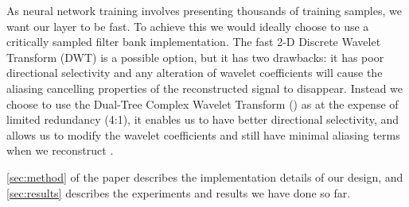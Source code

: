 As neural network training involves presenting thousands of training samples, we want our layer to
be fast. To achieve this we would ideally choose to use a critically sampled filter bank
implementation. The fast 2-D Discrete Wavelet Transform (DWT) is a possible option, but it has two
drawbacks: it has poor directional selectivity and any alteration of wavelet coefficients will cause
the aliasing cancelling properties of the reconstructed signal to disappear.  Instead we choose to
use the Dual-Tree Complex Wavelet Transform (\DTCWT) \cite{selesnick_dual-tree_2005} as at the
expense of limited redundancy (4:1), it enables us to have better directional selectivity, and allows
us to modify the wavelet coefficients and still have minimal aliasing terms when we reconstruct
\cite{kingsbury_complex_2001}.

\autoref{sec:method} of the paper describes the implementation details of our design, and
\autoref{sec:results} describes the experiments and results we have done so far.

